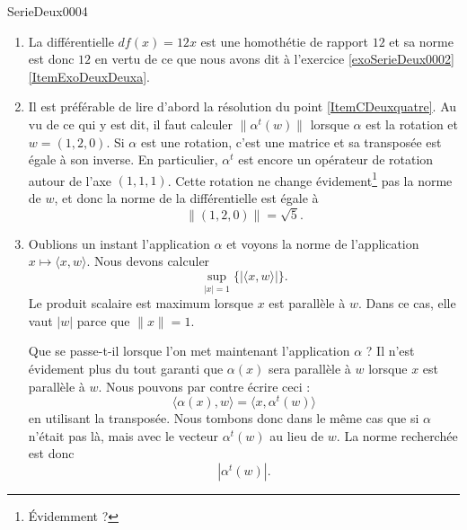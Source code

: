 
\begin{corrige}{SerieDeux0004}

	\begin{enumerate}

		\item
			La différentielle $df(x)=12x$ est une homothétie de rapport $12$ et sa norme est donc $12$ en vertu de ce que nous avons dit à l'exercice \ref{exoSerieDeux0002}\ref{ItemExoDeuxDeuxa}.
		\item Il est préférable de lire d'abord la résolution du point \ref{ItemCDeuxquatre}. Au vu de ce qui y est dit, il faut calculer $\| \alpha^t(w) \|$ lorsque $\alpha$ est la rotation et $w=(1,2,0)$. Si $\alpha$ est une rotation, c'est une matrice  et sa transposée est égale à son inverse. En particulier, $\alpha^t$ est encore un opérateur de rotation autour de l'axe $(1,1,1)$. Cette rotation ne change évidement\footnote{Évidemment ?} pas la norme de $w$, et donc la norme de la différentielle est égale à
			\begin{equation}
				\| (1,2,0) \|=\sqrt{5}.
			\end{equation}
			
		\item\label{ItemCDeuxquatre}
			Oublions un instant l'application $\alpha$ et voyons la norme de l'application $x\mapsto\langle x, w\rangle $. Nous devons calculer
			\begin{equation}
				\sup_{| x |=1}\{ | \langle x,w\rangle | \}.
			\end{equation}
			Le produit scalaire est maximum lorsque $x$ est parallèle à $w$. Dans ce cas, elle vaut $| w |$ parce que $\| x \|=1$.

			Que se passe-t-il lorsque l'on met maintenant l'application $\alpha$ ? Il n'est évidement plus du tout garanti que $\alpha(x)$ sera parallèle à $w$ lorsque $x$ est parallèle à $w$. Nous pouvons par contre écrire ceci :
			\begin{equation}
				\langle \alpha(x), w\rangle =\langle x, \alpha^t(w)\rangle 
			\end{equation}
			en utilisant la transposée. Nous tombons donc dans le même cas que si $\alpha$ n'était pas là, mais avec le vecteur $\alpha^t(w)$ au lieu de $w$. La norme recherchée est donc
			\begin{equation}
				| \alpha^t(w) |.
			\end{equation}


\end{enumerate}
\end{corrige}
